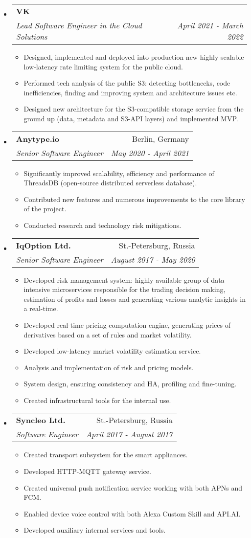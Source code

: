 \documentclass[letterpaper,11pt]{article}
\makeatletter
\newcommand{\resitem}[1]{\item #1 \vspace{-2pt}}
\newcommand{\ressubheading}[4]{
\begin{tabular*}{6.5in}{l@{\cftdotfill{\cftsecdotsep}\extracolsep{\fill}}r}
		\textbf{#1} & #2 \\
		\textit{#3} & \textit{#4} \\
\end{tabular*}\vspace{-6pt}}
\makeatother
\begin{document}
\begin{itemize}

\item
	\ressubheading{VK}{}{Lead Software Engineer in the Cloud Solutions}{April 2021 - March 2022}
	\begin{itemize}
		\resitem{Designed, implemented and deployed into production new highly scalable low-latency rate limiting system for the public cloud.}
		\resitem{Performed tech analysis of the public S3: detecting bottlenecks, code inefficiencies, finding and improving system and architecture issues etc.}
		\resitem{Designed new architecture for the S3-compatible storage service from the ground up (data, metadata and S3-API layers) and implemented MVP.}
	\end{itemize}

\item
	\ressubheading{Anytype.io}{Berlin, Germany}{Senior Software Engineer}{May 2020 - April 2021}
	\begin{itemize}
		\resitem{Significantly improved scalability, efficiency and performance of ThreadsDB (open-source distributed serverless database).}
		\resitem{Contributed new features and numerous improvements to the core library of the project.}
		\resitem{Conducted research and technology risk mitigations.}
	\end{itemize}

\item
	\ressubheading{IqOption Ltd.}{St.-Petersburg, Russia}{Senior Software Engineer}{August 2017 - May 2020}
	\begin{itemize}
		\resitem{Developed risk management system: highly available group of data intensive microservices responsible for the trading decision making, estimation of profits and losses and generating various analytic insights in a real-time.}
		\resitem{Developed real-time pricing computation engine, generating prices of derivatives based on a set of rules and market volatility.}
		\resitem{Developed low-latency market volatility estimation service.}
		\resitem{Analysis and implementation of risk and pricing models.}
		\resitem{System design, ensuring consistency and HA, profiling and fine-tuning.}
		\resitem{Created infrastructural tools for the internal use.}
	\end{itemize}

\item
	\ressubheading{Syncleo Ltd.}{St.-Petersburg, Russia}{Software Engineer}{April 2017 - August 2017}
	\begin{itemize}
		\resitem{Created transport subsystem for the smart appliances.}
		\resitem{Developed HTTP-MQTT gateway service.}
		\resitem{Created universal push notification service working with both APNs and FCM.}
		\resitem{Enabled device voice control with both Alexa Custom Skill and API.AI.}
		\resitem{Developed auxiliary internal services and tools.}
	\end{itemize}


\end{itemize}
\end{document}
